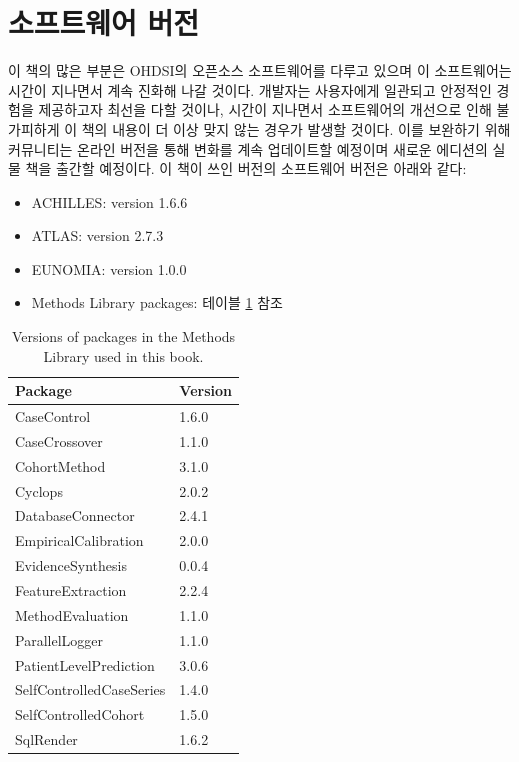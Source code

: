 \documentclass[10.5pt]{book}
\providecommand{\tightlist}{%
  \setlength{\itemsep}{0pt}\setlength{\parskip}{0pt}}
\theoremstyle{definition}
\theoremstyle{definition}
\theoremstyle{definition}
\theoremstyle{remark}
\begin{document}
\section*{소프트웨어 버전}\label{-}

이 책의 많은 부분은 OHDSI의 오픈소스 소프트웨어를 다루고 있으며 이
소프트웨어는 시간이 지나면서 계속 진화해 나갈 것이다. 개발자는
사용자에게 일관되고 안정적인 경험을 제공하고자 최선을 다할 것이나,
시간이 지나면서 소프트웨어의 개선으로 인해 불가피하게 이 책의 내용이 더
이상 맞지 않는 경우가 발생할 것이다. 이를 보완하기 위해 커뮤니티는
온라인 버전을 통해 변화를 계속 업데이트할 예정이며 새로운 에디션의 실물
책을 출간할 예정이다. 이 책이 쓰인 버전의 소프트웨어 버전은 아래와 같다:

\begin{itemize}
\tightlist
\item
  ACHILLES: version 1.6.6
\item
  ATLAS: version 2.7.3
\item
  EUNOMIA: version 1.0.0
\item
  Methods Library packages: 테이블 \ref{tab:packageVersions} 참조
\end{itemize}

\begin{table}[t]

\caption{\label{tab:packageVersions}Versions of packages in the Methods Library used in this book.}
\centering
\begin{tabular}{ll}
\toprule
Package & Version\\
\midrule
CaseControl & 1.6.0\\
CaseCrossover & 1.1.0\\
CohortMethod & 3.1.0\\
Cyclops & 2.0.2\\
DatabaseConnector & 2.4.1\\
\addlinespace
EmpiricalCalibration & 2.0.0\\
EvidenceSynthesis & 0.0.4\\
FeatureExtraction & 2.2.4\\
MethodEvaluation & 1.1.0\\
ParallelLogger & 1.1.0\\
\addlinespace
PatientLevelPrediction & 3.0.6\\
SelfControlledCaseSeries & 1.4.0\\
SelfControlledCohort & 1.5.0\\
SqlRender & 1.6.2\\
\bottomrule
\end{tabular}
\end{table}
\end{document}
